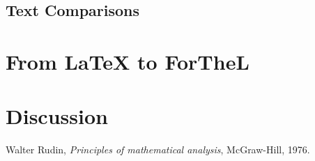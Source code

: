 \documentclass{article}
\begin{document}
\subsection{Text Comparisons}



\section{{From \LaTeX} to ForTheL}



\section{Discussion}


\begin{thebibliography}{1}

  Walter Rudin,
  \textit{Principles of mathematical analysis},
  McGraw-Hill,
  1976.

\end{thebibliography}
  
\end{document}
